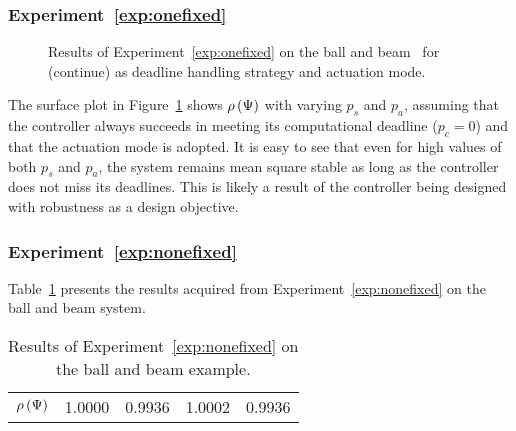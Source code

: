 \subsubsection*{Experiment~\ref{exp:onefixed}}%
%
\begin{figure}[t]
    \centering
    \caption{Results of Experiment~\ref{exp:onefixed} on the ball and beam~\cite{Vreman:2022} for (continue) \tKZ{} as deadline handling strategy and actuation mode.}
    \label{fig:nils-kz-sa}
\end{figure}
%
The surface plot in Figure~\ref{fig:nils-kz-sa} shows $\rho\left( \Psi \right)$ with varying $p_s$ and $p_a$, assuming that the controller always succeeds in meeting its computational deadline ($p_c=0$) and that the \tZ{} actuation mode is adopted.
It is easy to see that even for high values of both $p_s$ and $p_a$, the system remains mean square stable as long as the controller does not miss its deadlines.
This is likely a result of the controller being designed with robustness as a design objective.

\subsubsection*{Experiment~\ref{exp:nonefixed}}%
Table~\ref{tab:bnb} presents the results acquired from Experiment~\ref{exp:nonefixed} on the ball and beam system.
%
\begin{table}[h]
    \centering
    \def\arraystretch{1.25}
    \caption{Results of Experiment~\ref{exp:nonefixed} on the ball and beam example.}
    \label{tab:bnb}
    \begin{tabular}{c|cccc}
                            & \tKZ{} & \tKH{} & \tSZ{} & \tSH{} \\\hline\hline
        $\rho\left( \Psi \right)$  & 1.0000 & 0.9936 & 1.0002 & 0.9936
    \end{tabular}
\end{table}


